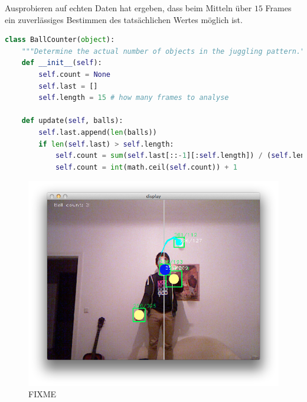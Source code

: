 \documentclass[12pt,a4paper,ngerman]{scrartcl}
\begin{document}
Ausprobieren auf echten Daten hat ergeben, dass beim Mitteln über $15$ Frames
ein zuverlässiges Bestimmen des tatsächlichen Wertes möglich ist.

\begin{lstlisting}[language=Python]
class BallCounter(object):
    """Determine the actual number of objects in the juggling pattern."""
    def __init__(self):
        self.count = None
        self.last = []
        self.length = 15 # how many frames to analyse

    def update(self, balls):
        self.last.append(len(balls))
        if len(self.last) > self.length:
            self.count = sum(self.last[::-1][:self.length]) / (self.length*1.0)
            self.count = int(math.ceil(self.count)) + 1
\end{lstlisting}


\begin{figure}[H]
    \centering
    \includegraphics[scale=0.5]{img/ballcount-1.png}
    \vspace{-0.5cm}
    \caption{FIXME}
    \label{ballcount-1}
\end{figure}
\end{document}
